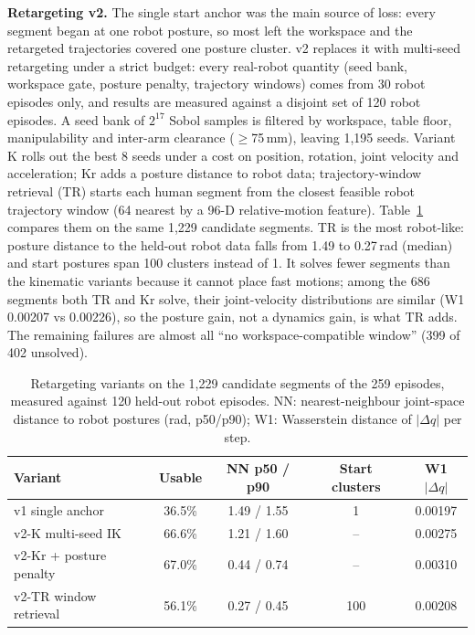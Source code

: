 \documentclass[conference,10pt]{IEEEtran}
\newcommand{\mm}{\,mm\xspace}
\begin{document}
\textbf{Retargeting v2.} The single start anchor was the main source of loss: every segment began at one robot posture, so most
left the workspace and the retargeted trajectories covered one posture cluster. v2 replaces it with multi-seed retargeting under a
strict budget: every real-robot quantity (seed bank, workspace gate, posture penalty, trajectory windows) comes from 30 robot
episodes only, and results are measured against a disjoint set of 120 robot episodes. A seed bank of $2^{17}$ Sobol samples is
filtered by workspace, table floor, manipulability and inter-arm clearance ($\ge$75\mm), leaving 1{,}195 seeds. Variant K rolls out
the best 8 seeds under a cost on position, rotation, joint velocity and acceleration; Kr adds a posture distance to robot data;
trajectory-window retrieval (TR) starts each human segment from the closest feasible robot trajectory window (64 nearest by a 96-D
relative-motion feature). Table~\ref{tab:retarget} compares them on the same 1{,}229 candidate segments. TR is the most robot-like:
posture distance to the held-out robot data falls from 1.49 to 0.27\,rad (median) and start postures span 100 clusters instead of 1.
It solves fewer segments than the kinematic variants because it cannot place fast motions; among the 686 segments both TR and Kr
solve, their joint-velocity distributions are similar (W1 0.00207 vs 0.00226), so the posture gain, not a dynamics gain, is what TR
adds. The remaining failures are almost all ``no workspace-compatible window'' (399 of 402 unsolved).

\begin{table}[t]
\centering\footnotesize\setlength{\tabcolsep}{3.5pt}
\caption{Retargeting variants on the 1{,}229 candidate segments of the 259 episodes, measured against 120 held-out robot
episodes. NN: nearest-neighbour joint-space distance to robot postures (rad, p50/p90); W1: Wasserstein distance of
$|\Delta q|$ per step.}
\label{tab:retarget}
\begin{tabular}{@{}lcccc@{}}
\toprule
Variant & Usable & NN p50 / p90 & Start clusters & W1 $|\Delta q|$ \\
\midrule
v1 single anchor & 36.5\% & 1.49 / 1.55 & 1 & 0.00197 \\
v2-K multi-seed IK & 66.6\% & 1.21 / 1.60 & -- & 0.00275 \\
v2-Kr + posture penalty & 67.0\% & 0.44 / 0.74 & -- & 0.00310 \\
v2-TR window retrieval & 56.1\% & 0.27 / 0.45 & 100 & 0.00208 \\
\bottomrule
\end{tabular}
\end{table}
\end{document}
